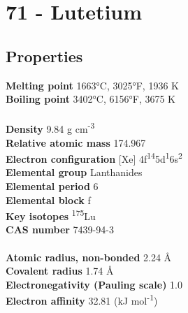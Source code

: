 \section{71 - Lutetium}
\label{sec:elem-lutetium}
\subsection{Properties}
\textbf{Melting point} 1663°C, 3025°F, 1936 K\\
\textbf{Boiling point} 3402°C, 6156°F, 3675 K\\
\\
\textbf{Density} 9.84 g cm\textsuperscript{-3}\\
\textbf{Relative atomic mass} 174.967\\
\textbf{Electron configuration} [Xe] 4f\textsuperscript{14}5d\textsuperscript{1}6s\textsuperscript{2}\\
\textbf{Elemental group} Lanthanides\\
\textbf{Elemental period} 6\\
\textbf{Elemental block} f\\
\textbf{Key isotopes} \textsuperscript{175}Lu\\
\textbf{CAS number} 7439-94-3\\
\\
\textbf{Atomic radius, non-bonded} 2.24 Å\\
\textbf{Covalent radius} 1.74 Å\\
\textbf{Electronegativity (Pauling scale)} 1.0\\
\textbf{Electron affinity} 32.81 (kJ mol\textsuperscript{-1})\\